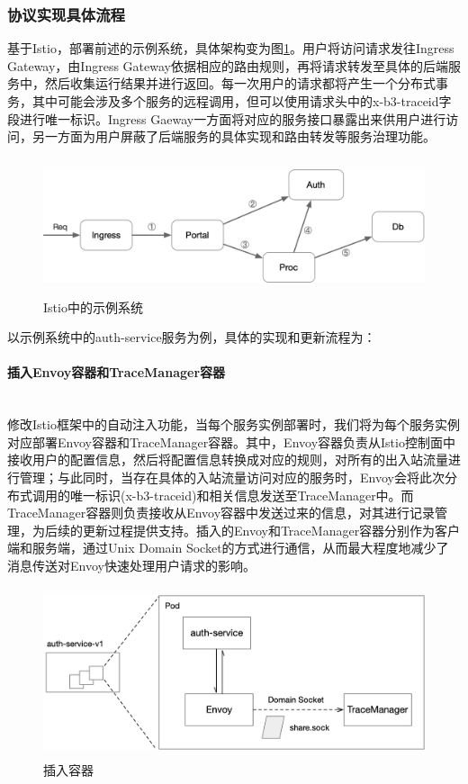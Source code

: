 \documentclass[a4paper]{article}
\theoremstyle{definition}
\begin{document}
\subsubsection{协议实现具体流程}
基于Istio，部署前述的示例系统，具体架构变为图\ref{fig:demo_arch_on_istio}。用户将访问请求发往Ingress Gateway，由Ingress Gateway依据相应的路由规则，再将请求转发至具体的后端服务中，然后收集运行结果并进行返回。每一次用户的请求都将产生一个分布式事务，其中可能会涉及多个服务的远程调用，但可以使用请求头中的x-b3-traceid字段进行唯一标识。Ingress Gaeway一方面将对应的服务接口暴露出来供用户进行访问，另一方面为用户屏蔽了后端服务的具体实现和路由转发等服务治理功能。

\begin{figure}[ht]
 \centering
 \includegraphics[height=4cm]{images/demo_arch_on_istio.png}
 \caption{Istio中的示例系统}
 \label{fig:demo_arch_on_istio}
\end{figure}

以示例系统中的auth-service服务为例，具体的实现和更新流程为：
\paragraph{插入Envoy容器和TraceManager容器}\mbox{}\\

修改Istio框架中的自动注入功能，当每个服务实例部署时，我们将为每个服务实例对应部署Envoy容器和TraceManager容器。其中，Envoy容器负责从Istio控制面中接收用户的配置信息，然后将配置信息转换成对应的规则，对所有的出入站流量进行管理；与此同时，当存在具体的入站流量访问对应的服务时，Envoy会将此次分布式调用的唯一标识(x-b3-traceid)和相关信息发送至TraceManager中。而TraceManager容器则负责接收从Envoy容器中发送过来的信息，对其进行记录管理，为后续的更新过程提供支持。插入的Envoy和TraceManager容器分别作为客户端和服务端，通过Unix Domain Socket的方式进行通信，从而最大程度地减少了消息传送对Envoy快速处理用户请求的影响。
\begin{figure}[ht]
 \centering
 \includegraphics[height=5cm]{images/insert_containers.png}
 \caption{插入容器}
 \label{fig:insert_containers}
\end{figure}
\end{document}
